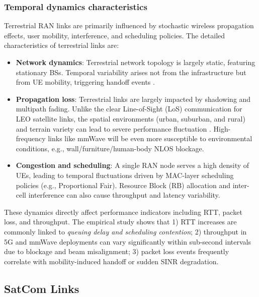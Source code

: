 \documentclass[12pt]{article}
\begin{document}
\subsubsection{Temporal dynamics characteristics}
Terrestrial RAN links are primarily influenced by stochastic wireless propagation effects, user mobility, interference, and scheduling policies. The detailed characteristics of terrestrial links are:
\begin{itemize}
    \item \textbf{Network dynamics}: Terrestrial network topology is largely static, featuring stationary BSs. Temporal variability arises not from the infrastructure but from UE mobility, triggering handoff events \cite{karmakar2022mobility}.
    
    \item \textbf{Propagation loss}: Terrestrial links are largely impacted by shadowing and multipath fading. Unlike the clear Line-of-Sight (LoS) communication for LEO satellite links, the spatial environments (urban, suburban, and rural) and terrain variety can lead to severe performance fluctuation \cite{agrawal2009correlated}. High-frequency links like mmWave will be even more susceptible to environmental conditions, e.g., wall/furniture/human-body NLOS blockage.
    
    \item \textbf{Congestion and scheduling}: A single RAN node serves a high density of UEs, leading to temporal fluctuations driven by MAC-layer scheduling policies (e.g., Proportional Fair). Resource Block (RB) allocation and inter-cell interference can also cause throughput and latency variability.
\end{itemize}

These dynamics directly affect performance indicators including RTT, packet loss, and throughput. The empirical study \cite{narayanan2020first} shows that 1) RTT increases are commonly linked to \textit{queuing delay and scheduling contention}; 2) throughput in 5G and mmWave deployments can vary significantly within sub-second intervals due to blockage and beam misalignment;  3) packet loss events frequently correlate with mobility-induced handoff or sudden SINR degradation. 

\subsection{SatCom Links}
\end{document}

